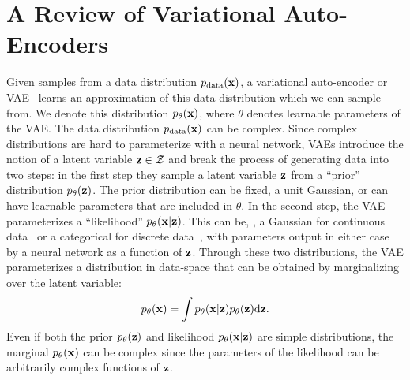 \chapter{A Review of Variational Auto-Encoders}
\label{sec:background}


Given samples from a data distribution $p_{\rm{data}}({\mathbf{x}})$, a variational auto-encoder or VAE~\citep{kingma2013auto,rezende2014stochastic} learns an approximation of this data distribution which we can sample from. We denote this distribution $p_\theta({\mathbf{x}})$, where $\theta$ denotes learnable parameters of the VAE. The data distribution $p_{\rm{data}}({\mathbf{x}})$ can be complex. Since complex distributions are hard to parameterize with a neural network, VAEs introduce the notion of a latent variable ${\mathbf{z}} \in {\mathcal{Z}}$ and break the process of generating data into two steps: in the first step they sample a latent variable ${\mathbf{z}}$ from a ``prior'' distribution $p_\theta({\mathbf{z}})$. The prior distribution can be fixed, \eg a unit Gaussian, or can have learnable parameters that are included in $\theta$. In the second step, the VAE parameterizes a ``likelihood'' $p_\theta({\mathbf{x}}|{\mathbf{z}})$. This can be, \eg, a Gaussian for continuous data~\citep{kingma2013auto} or a categorical for discrete data~\citep{child2020very}, with parameters output in either case by a neural network as a function of ${\mathbf{z}}$. Through these two distributions, the VAE parameterizes a distribution in data-space that can be obtained by marginalizing over the latent variable:
\begin{equation} \label{eq:vae-marginal}
p_\theta({\mathbf{x}}) = \int p_\theta({\mathbf{x}}|{\mathbf{z}})p_\theta({\mathbf{z}}) \mathrm{d}{\mathbf{z}}.
\end{equation}
Even if both the prior $p_\theta({\mathbf{z}})$ and likelihood $p_\theta({\mathbf{x}}|{\mathbf{z}})$ are simple distributions, the marginal $p_\theta({\mathbf{x}})$ can be complex since the parameters of the likelihood can be arbitrarily complex functions of ${\mathbf{z}}$.

